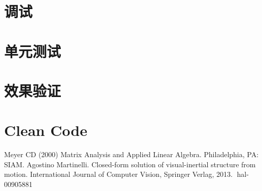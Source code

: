 \documentclass{article}
\begin{document}
\section{调试}

\section{单元测试}

\section{效果验证}

\section{Clean Code}



\begin{thebibliography}{99}  
    Meyer CD (2000) Matrix Analysis and Applied Linear Algebra. Philadelphia, PA: SIAM.
     Agostino Martinelli. Closed-form solution of visual-inertial structure from motion. International
    Journal of Computer Vision, Springer Verlag, 2013. ￿hal-00905881
\end{thebibliography}
\end{document}
